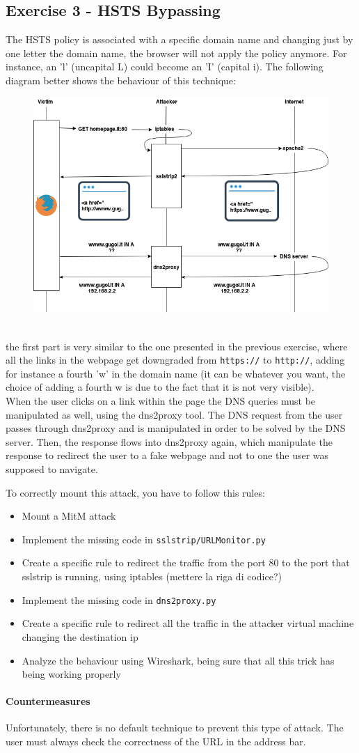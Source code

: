 \documentclass[draft]{article}
\begin{document}
\subsection{Exercise 3 - HSTS Bypassing}
The HSTS policy is associated with a specific domain name and changing just by one letter the domain name, the browser will
not apply the policy anymore. For instance, an ’l’ (uncapital L) could become an ’I’ (capital i). The following diagram better shows the behaviour of this technique:
\begin{figure}[h]
  \includegraphics[width=.9\textwidth]{../figures/hsts_bypass_time}
  \caption{}
\end{figure}
\\
the first part is very similar to the one presented in the previous exercise, where all the links in the webpage get downgraded from \texttt{https://} to \texttt{http://}, adding for instance a fourth 'w' in the domain name (it can be whatever you want, the choice of adding a fourth w is due to the fact that it is not very visible).\\
When the user clicks on a link within the page the DNS queries must be manipulated as well, using the dns2proxy tool. The DNS request from the user passes through dns2proxy and is manipulated in order to be solved by the DNS server. Then, the response flows into dns2proxy again, which manipulate the response to redirect the user to a fake webpage and not to one the user was supposed to navigate.

To correctly mount this attack, you have to follow this rules:
\begin{itemize}
  \item Mount a MitM attack
  \item Implement the missing code in \texttt{sslstrip/URLMonitor.py}
  \item Create a specific rule to redirect the traffic from the port 80 to the port that sslstrip is running, using iptables (mettere la riga di codice?)
  \item Implement the missing code in \texttt{dns2proxy.py}
  \item Create a specific rule to redirect all the traffic in the attacker virtual machine changing the destination ip
  \item Analyze the behaviour using Wireshark, being sure that all this trick has being working properly
\end{itemize}
\paragraph{Countermeasures}
Unfortunately, there is no default technique to prevent this type of attack. The user must always check the correctness of the URL in the address bar.
\end{document}
